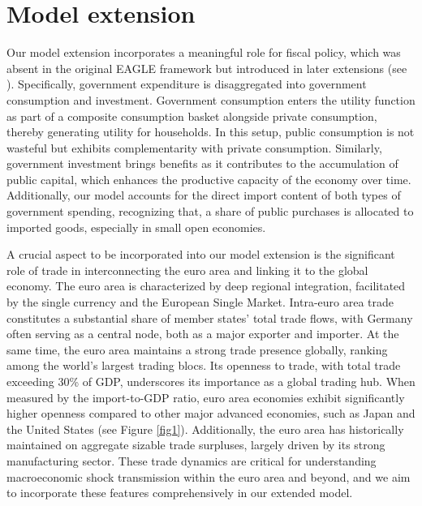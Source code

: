 \documentclass[paper=letter, fontsize=12pt]{article}
\begin{document}
\section*{Model extension}

Our model extension incorporates a meaningful role for fiscal policy, which was absent in the original EAGLE framework but introduced in later extensions (see \cite[Clancy et al. (2012)]{Clancy}). Specifically, government expenditure is disaggregated into government consumption and investment. Government consumption enters the utility function as part of a composite consumption basket alongside private consumption, thereby generating utility for households. In this setup, public consumption is not wasteful but exhibits complementarity with private consumption. Similarly, government investment brings benefits as it contributes to the accumulation of public capital, which enhances the productive capacity of the economy over time. Additionally, our model accounts for the direct import content of both types of government spending, recognizing that, a share of public purchases is allocated to imported goods, especially in small open economies.

A crucial aspect to be incorporated into our model extension is the significant role of trade in interconnecting the euro area and linking it to the global economy. The euro area is characterized by deep regional integration, facilitated by the single currency and the European Single Market. Intra-euro area trade constitutes a substantial share of member states' total trade flows, with Germany often serving as a central node, both as a major exporter and importer. At the same time, the euro area maintains a strong trade presence globally, ranking among the world's largest trading blocs. Its openness to trade, with total trade exceeding 30\% of GDP, underscores its importance as a global trading hub. When measured by the import-to-GDP ratio, euro area economies exhibit significantly higher openness compared to other major advanced economies, such as Japan and the United States (see Figure \ref{fig1}). Additionally, the euro area has historically maintained on aggregate sizable trade surpluses, largely driven by its strong manufacturing sector. These trade dynamics are critical for understanding macroeconomic shock transmission within the euro area and beyond, and we aim to incorporate these features comprehensively in our extended model.
\end{document}
